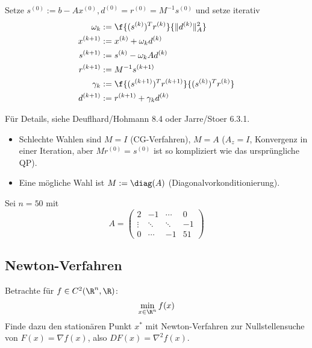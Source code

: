 \documentclass[11pt]{scrbook}
\begin{document}
\begin{df} \label{4.25}
	Setze $s^{(0)} := b - Ax^{(0)}, d^{(0)} = r^{(0)} = M^{-1}s^{(0)}$ und setze iterativ
	\begin{align*}
		\omega_k &:= \f {(s^{(k)})^T r^{(k)}}{\|d^{(k)}\|_A^2} \\
		x^{(k+1)} &:= x^{(k)} + \omega_k d^{(k)} \\
		s^{(k+1)} &:= s^{(k)} - \omega_k A d^{(k)} \\
		r^{(k+1)} &:= M^{-1}s^{(k+1)} \\
		\gamma_k &:= \f {(s^{(k+1)})^T r^{(k+1)}}{(s^{(k)})^T r^{(k)}} \\
		d^{(k+1)} &:= r^{(k+1)} + \gamma_k d^{(k)}
	\end{align*}
	\begin{note}
		Für Details, siehe Deuflhard/Hohmann 8.4 oder Jarre/Stoer 6.3.1.
	\end{note}
	\begin{note}
		\begin{itemize}
			\item
				Schlechte Wahlen sind $M = I$ (CG-Verfahren), $M=A$ ($A_z = I$, Konvergenz in einer Iteration, aber $Mr^{(0)} = s^{(0)}$ ist so kompliziert wie das ursprüngliche QP).
			\item
				Eine mögliche Wahl ist $M := \diag(A)$ (Diagonalvorkonditionierung).
		\end{itemize}
	\end{note}
\end{df}

\begin{ex*}
	Sei $n = 50$ mit
	\[
		A = \begin{pmatrix}
			2 & - 1 & \cdots & 0 \\
			\vdots & \ddots & \ddots & -1 \\
			0 & \cdots & -1 & 51 
		\end{pmatrix}
	\]
\end{ex*}


\subsection{Newton-Verfahren}


Betrachte für $f \in C^2(\R^n, \R)$:
\[
	\min_{x \in \R^n} f(x)
\]
Finde dazu den stationären Punkt $x^*$ mit Newton-Verfahren zur Nullstellensuche von $F(x) = \nabla f(x)$, also $DF(x) = \nabla^2 f(x)$.
\end{document}
